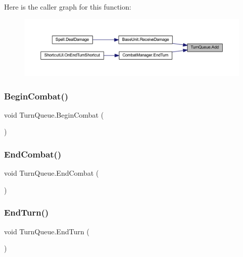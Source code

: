 Here is the caller graph for this function\+:\nopagebreak
\begin{figure}[H]
\begin{center}
\leavevmode
\includegraphics[width=350pt]{class_turn_queue_aa677cc3ae9812e45a5b7e8932c199e27_icgraph}
\end{center}
\end{figure}
\mbox{\label{class_turn_queue_a7de50ac6b689f76c71d808962b6d1b86}} 
\subsubsection{\texorpdfstring{BeginCombat()}{BeginCombat()}}
{\footnotesize\ttfamily void Turn\+Queue.\+Begin\+Combat (\begin{DoxyParamCaption}{ }\end{DoxyParamCaption})}

\mbox{\label{class_turn_queue_a9b3696b9a7672bbb8a79e3f0dc3ef393}} 
\subsubsection{\texorpdfstring{EndCombat()}{EndCombat()}}
{\footnotesize\ttfamily void Turn\+Queue.\+End\+Combat (\begin{DoxyParamCaption}{ }\end{DoxyParamCaption})}

\mbox{\label{class_turn_queue_aadfdf0f72201cdc985ad2dbb9520eaee}} 
\subsubsection{\texorpdfstring{EndTurn()}{EndTurn()}}
{\footnotesize\ttfamily void Turn\+Queue.\+End\+Turn (\begin{DoxyParamCaption}{ }\end{DoxyParamCaption})}

